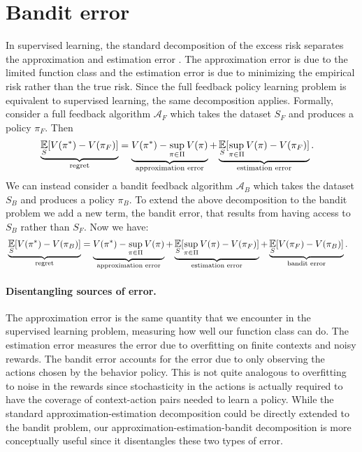 \section{Bandit error}\label{sec:decomp}


In supervised learning, the standard decomposition of the excess risk separates the approximation and estimation error  \citep{bottou2008tradeoffs}. The approximation error is due to the limited function class and the estimation error is due to minimizing the empirical risk rather than the true risk. Since the full feedback policy learning problem is equivalent to supervised learning, the same decomposition applies. Formally, consider a full feedback algorithm $ \mathcal{A}_F$ which takes the dataset $ S_F $ and produces a policy $ \pi_F$. Then
\begin{align*}
    &\underbrace{\E_{S}[V(\pi^*) - V(\pi_F)]}_{\textrm{regret}} = \underbrace{V(\pi^*) - \sup_{\pi\in \Pi}V(\pi)}_{\textrm{approximation\ error}} + \underbrace{\E_{S}[ \sup_{\pi\in \Pi}V(\pi) - V(\pi_F)]}_{\textrm{estimation\ error}}.
\end{align*}
We can instead consider a bandit feedback algorithm $ \mathcal{A}_B$ which takes the dataset $ S_B $ and produces a policy $ \pi_B$.
To extend the above decomposition to the bandit problem we add a new term, the bandit error, that results from having access to $ S_B$ rather than $ S_F$. Now we have:
\begin{align*}
    &\underbrace{\E_{S}[V(\pi^*) - V(\pi_B)]}_{\textrm{regret}} = \underbrace{V(\pi^*) - \sup_{\pi\in \Pi}V(\pi)}_{\textrm{approximation\ error}} + \underbrace{\E_{S}[ \sup_{\pi\in \Pi}V(\pi) - V(\pi_F)]}_{\textrm{estimation\ error}} + \underbrace{\E_{S}[V(\pi_F) - V(\pi_B)]}_{\textrm{bandit\ error}}.
\end{align*}

\paragraph{Disentangling sources of error.}
The approximation error is the same quantity that we encounter in the supervised learning problem, measuring how well our function class can do.
The estimation error measures the error due to overfitting on finite contexts and noisy rewards.
The bandit error accounts for the error due to only observing the actions chosen by the behavior policy.
This is not quite analogous to overfitting to noise in the rewards since stochasticity in the actions is actually required to have the coverage of context-action pairs needed to learn a policy.
While the standard approximation-estimation decomposition could be directly extended to the bandit problem, our approximation-estimation-bandit decomposition is more conceptually useful since it disentangles these two types of error.




